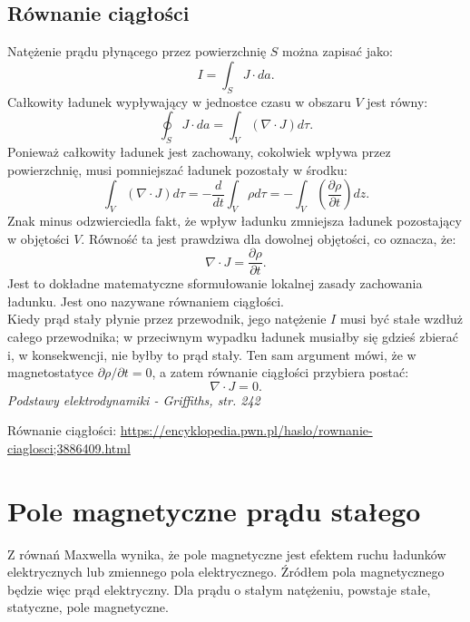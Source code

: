 \documentclass{article}
\begin{document}
\subsection{Równanie ciągłości}

Natężenie prądu płynącego przez powierzchnię $S$ można zapisać jako:
\begin{equation*}
    I = \int_{S} J\cdot da.
\end{equation*}
Całkowity ładunek wypływający w jednostce czasu w obszaru $V$ jest równy:
\begin{equation*}
    \oint_S J\cdot da = \int_V (\nabla \cdot J) d\tau.
\end{equation*}
Ponieważ całkowity ładunek jest zachowany, cokolwiek wpływa przez powierzchnię, musi pomniejszać ładunek pozostały w środku:
\begin{equation*}
    \int_V (\nabla \cdot J) d\tau=-\frac{d}{dt} \int_V \rho d\tau = -\int_V \left( \frac{\partial \rho}{\partial t}\right)dz.
\end{equation*}
Znak minus odzwierciedla fakt, że wpływ ładunku zmniejsza ładunek pozostający w objętości $V$. Równość ta jest prawdziwa dla dowolnej objętości, co oznacza, że:
\begin{equation*}
    \nabla \cdot J = \frac{\partial \rho}{\partial t}.
\end{equation*}
Jest to dokładne matematyczne sformułowanie lokalnej zasady zachowania ładunku. Jest ono nazywane równaniem ciągłości. \\
Kiedy prąd stały płynie przez przewodnik, jego natężenie $I$ musi być stałe wzdłuż całego przewodnika; w przeciwnym wypadku ładunek musiałby się gdzieś zbierać i, w konsekwencji, nie byłby to prąd stały. Ten sam argument mówi, że w magnetostatyce $\partial \rho / \partial t=0$, a zatem równanie ciągłości przybiera postać:
\begin{equation*}
    \nabla \cdot J = 0.
\end{equation*}
\textit{Podstawy elektrodynamiki - Griffiths, str. 242}

Równanie ciągłości: \url{https://encyklopedia.pwn.pl/haslo/rownanie-ciaglosci;3886409.html}
\section{Pole magnetyczne prądu stałego}

Z równań Maxwella wynika, że  pole magnetyczne jest efektem ruchu ładunków elektrycznych lub zmiennego pola elektrycznego. Źródłem pola magnetycznego będzie więc prąd elektryczny. Dla prądu o stałym natężeniu, powstaje stałe, statyczne, pole magnetyczne. 
\end{document}
